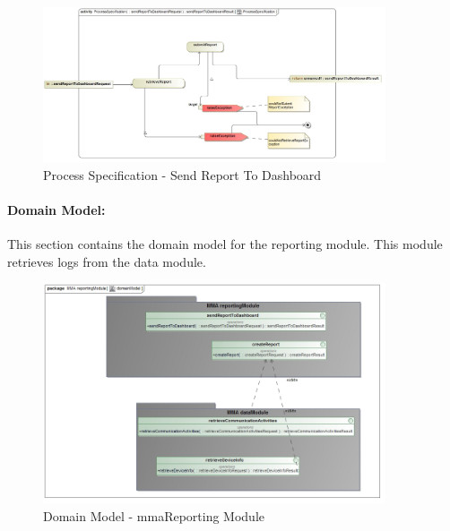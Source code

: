 \documentclass[hidelinks, 12pt, oneside]{article}
\begin{document}
		
		\begin{figure}[!htbp]
    		\centering
    		\includegraphics[width=0.9\textwidth]{img/ProcessSpecificationSendResportToDashboard.jpg}
    		\caption{Process Specification - Send Report To Dashboard}
    		\label{fig:ProcessSpec_submitReport}
		\end{figure}
		\newpage
		
			\paragraph{Domain Model:}
			This section contains the domain model for the reporting module. This module retrieves logs from the data module. 
			
			
			\begin{figure}[!htbp]
    		\centering
    		\includegraphics[width=0.9\textwidth]{img/domainModelReportModule.jpg}
    		\caption{Domain Model - mmaReporting Module}
    		\label{fig:DomainModel_reportingModule}
		\end{figure}	
\end{document}
